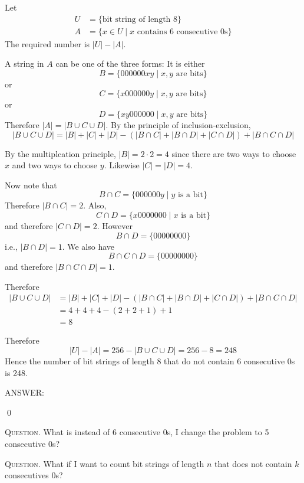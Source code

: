 Let 
\begin{align*}
U &= \{ \text{bit string of length 8} \} \\
A & = \{x \in U \mid x \text{ contains 6 consecutive 0s} \}
\end{align*}
The required number is $|U| - |A|$.

A string in $A$ can be one of the three forms:
It is either
\[
B = \{000000 x y \mid x, y \text{ are bits}\}
\]
or
\[
C = \{x 000000 y \mid x, y \text{ are bits}\}
\]
or
\[
D = \{x y 000000 \mid x, y \text{ are bits}\}
\]
Therefore $|A| = |B \cup C \cup D|$.
By the principle of inclusion-exclusion, 
\[
|B \cup C \cup D|
= |B| + |C| + |D| - (|B \cap C| + |B \cap D| + |C \cap D|) + |B \cap C \cap D|
\]

By the multiplcation principle, 
$|B| = 2 \cdot 2 = 4$ since there are two ways to choose
$x$ and two ways to choose $y$. 
Likewise $|C| = |D| = 4$.

Now note that 
\[
B \cap C = \{000000y \mid y \text{ is a bit}\}
\]
Therefore $|B \cap C| = 2$.
Also, 
\[
C \cap D = \{x 0000000 \mid x \text{ is a bit}\}
\]
and therefore $|C \cap D| = 2$.
However
\[
B \cap D = \{ 00000000 \}
\]
i.e., $|B \cap D| = 1$.
We also have 
\[
B \cap C \cap D = \{00000000\}
\]
and therefore $|B \cap C \cap D| = 1$.

Therefore
\begin{align*}
|B \cup C \cup D|
&= |B| + |C| + |D| - (|B \cap C| + |B \cap D| + |C \cap D|) + |B \cap C \cap D|
\\
&= 4 + 4 + 4 - (2 + 2 + 1) + 1 \\
&= 8
\end{align*}

Therefore 
\[
|U| - |A| = 256 - |B \cup C \cup D| = 256 - 8 = 248
\]
Hence the number of bit strings of length 8 that do not contain 
6 consecutive 0s is 248.

ANSWER:

\qed


\textsc{Question.}
What is instead of 6 consecutive 0s, I change the problem to 5 consecutive 0s?

\textsc{Question.}
What if I want to count
bit strings of length $n$ that does not contain
$k$ consecutives 0s? 
